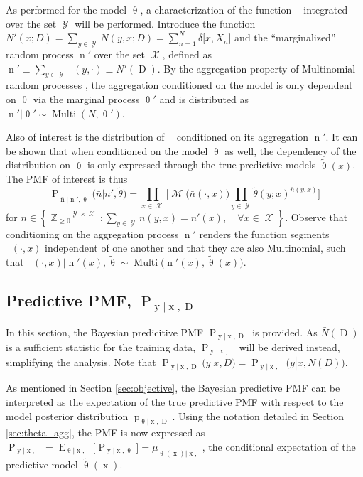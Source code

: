 \documentclass[conference]{IEEEtran}
\DeclareMathOperator{\xrm}{\mathrm{x}}
\DeclareMathOperator{\yrm}{\mathrm{y}}
\DeclareMathOperator{\Drm}{\mathrm{D}}
\DeclareMathOperator{\nrm}{\mathrm{n}}
\DeclareMathOperator{\nbarrm}{\bar{\mathrm{n}}}
\DeclareMathOperator{\Prm}{\mathrm{P}}
\DeclareMathOperator{\prm}{\mathrm{p}}
\DeclareMathOperator{\Erm}{\mathrm{E}}
\DeclareMathOperator{\Xcal}{\mathcal{X}}
\DeclareMathOperator{\Ycal}{\mathcal{Y}}
\DeclareMathOperator{\Mcal}{\mathcal{M}}
\DeclareMathOperator{\Zbb}{\mathbb{Z}}
\DeclareMathOperator{\Multi}{\mathrm{Multi}}
\begin{document}
As performed for the model $\uptheta$, a characterization of the function $\nbarrm$ integrated over the set $\Ycal$ will be performed. Introduce the function $N'(x;D) = \sum_{y \in \Ycal} \bar{N}(y,x;D) = \sum_{n=1}^N \delta\big[ x,X_n \big]$ and the ``marginalized'' random process $\nrm'$ over the set $\Xcal$, defined as $\nrm' \equiv \sum_{y \in \Ycal} \nbarrm(y,\cdot) \equiv N'(\Drm)$. By the aggregation property of Multinomial random processes \cite{johnson}, the aggregation conditioned on the model is only dependent on $\uptheta$ via the marginal process $\uptheta'$ and is distributed as $\nrm' | \uptheta' \sim \Multi(N,\uptheta')$. 

Also of interest is the distribution of $\nbarrm$ conditioned on its aggregation $\nrm'$. It can be shown that when conditioned on the model $\uptheta$ as well, the dependency of the distribution on $\uptheta$ is only expressed through the true predictive models $\tilde{\uptheta}(x)$. The PMF of interest is thus
\begin{equation}
\Prm_{\bar{\nrm} | \nrm' , \tilde{\uptheta}}\big(\bar{n} | n' , \tilde{\theta}\big) = \prod_{x \in \Xcal} \Bigg[ \Mcal\big( \bar{n}(\cdot,x) \big) \prod_{y \in \Ycal} \tilde{\theta}(y;x)^{\bar{n}(y,x)} \Bigg] 
\end{equation}
for $\bar{n} \in \left\{ {\Zbb_{\geq 0}}^{\Ycal \times \Xcal} : \sum_{y \in \Ycal} \bar{n}(y,x) = n'(x), \quad \forall x \in \Xcal \right\}$. Observe that conditioning on the aggregation process $\nrm'$ renders the function segments $\nbarrm(\cdot,x)$ independent of one another and that they are also Multinomial, such that $\nbarrm(\cdot,x) | \nrm'(x),\tilde{\uptheta} \sim \Multi\big( \nrm'(x),\tilde{\uptheta}(x) \big)$.









\subsection{Predictive PMF, $\Prm_{\yrm | \xrm,\Drm}$}

In this section, the Bayesian predicitive PMF $\Prm_{\yrm | \xrm,\Drm}$ is provided. As $\bar{N}(\Drm)$ is a sufficient statistic for the training data, $\Prm_{\yrm | \xrm,\nbarrm}$ will be derived instead, simplifying the analysis. Note that $\Prm_{\yrm | \xrm,\Drm}(y | x,D) = \Prm_{\yrm | \xrm,\nbarrm}\big( y | x,\bar{N}(D) \big)$.

As mentioned in Section \ref{sec:objective}, the Bayesian predictive PMF can be interpreted as the expectation of the true predictive PMF with respect to the model posterior distribution $\prm_{\uptheta | \xrm,\Drm}$. Using the notation detailed in Section \ref{sec:theta_agg}, the PMF is now expressed as $\Prm_{\yrm | \xrm,\nbarrm} = \Erm_{\uptheta | \xrm,\nbarrm}\big[ \Prm_{\yrm | \xrm,\uptheta} \big] = \mu_{\tilde{\uptheta}(\xrm) | \xrm,\nbarrm}$, the conditional expectation of the predictive model $\tilde{\uptheta}(\xrm)$.
\end{document}
